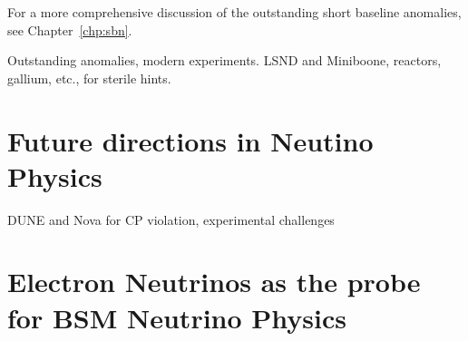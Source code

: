 For a more comprehensive discussion of the outstanding short baseline anomalies, see Chapter~\ref{chp:sbn}.

Outstanding anomalies, modern experiments.  LSND and Miniboone, reactors, gallium, etc., for sterile hints.



\section{Future directions in Neutino Physics}
\label{sec:future_experiments}
DUNE and Nova for CP violation, experimental challenges

\section{Electron Neutrinos as the probe for BSM Neutrino Physics}